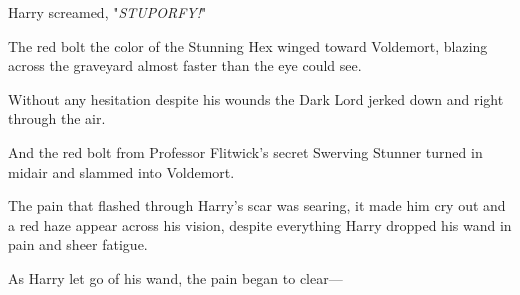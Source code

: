 Harry screamed, "\emph{STUPORFY!}"

The red bolt the color of the Stunning Hex winged toward Voldemort, blazing
across the graveyard almost faster than the eye could see.

Without any hesitation despite his wounds the Dark Lord jerked down and right
through the air.

And the red bolt from Professor Flitwick's secret Swerving Stunner turned in
midair and slammed into Voldemort.

The pain that flashed through Harry's scar was searing, it made him cry out and
a red haze appear across his vision, despite everything Harry dropped his wand
in pain and sheer fatigue.

As Harry let go of his wand, the pain began to clear---
